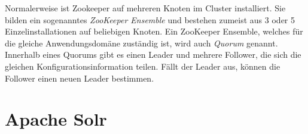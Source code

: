 \noindent
Normalerweise ist Zookeeper auf mehreren Knoten im Cluster installiert. Sie bilden ein sogenanntes \textit{ZooKeeper Ensemble} und bestehen zumeist aus 3 oder 5 Einzelinstallationen auf beliebigen Knoten. Ein ZooKeeper Ensemble, welches für die gleiche Anwendungsdomäne zuständig ist, wird auch \textit{Quorum} genannt. Innerhalb eines Quorums gibt es einen Leader und mehrere Follower, die sich die gleichen Konfigurationsinformation teilen. Fällt der Leader aus, können die Follower einen neuen Leader bestimmen.\cite{zookeeper_essentials}\\

\section{Apache Solr}
\label{sec:theory_solr}
